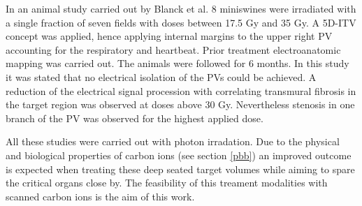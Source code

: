 \documentclass[type=dr, dr=rernat, accentcolor=tud7b,colorbacktitle, bigchapter, openright, twoside, 12pt ]{tudthesis}
\begin{document}
In an animal study carried out by Blanck et al. \cite{Bla13} 8 miniswines were irradiated with a single fraction of seven fields with doses 
between 17.5 Gy and 35 Gy. A 5D-ITV concept was applied, hence applying internal margins to the upper right PV accounting for the respiratory 
and heartbeat. Prior treatment electroanatomic mapping was carried out. The animals were followed for 6 months. In this study it was stated 
that no electrical isolation of the PVs could be achieved. A reduction of the electrical signal procession with correlating transmural 
fibrosis in the target region was observed at doses above 30 Gy. Nevertheless stenosis in one branch of the PV was observed for the highest 
applied dose.\newline

All these studies were carried out with photon irradation. Due to the physical and biological properties of carbon ions (see section \ref{pbb}) 
an improved outcome is expected when treating these deep seated target volumes while aiming to spare the critical organs close by. 
The feasibility of this treament modalities with scanned carbon ions is the aim of this work. 
\end{document}
